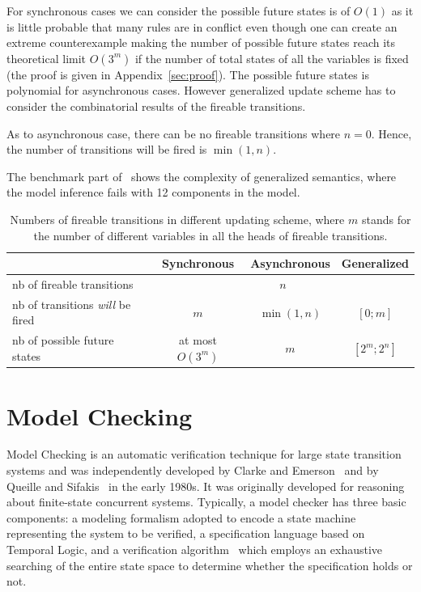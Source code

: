 For synchronous cases we can consider the possible future states is of $O(1)$ as it is little probable that many rules are in conflict even though one can create an extreme counterexample making the number of possible future states reach its theoretical limit $O(3^m)$ if the number of total states of all the variables is fixed (the proof is given in Appendix~\ref{sec:proof}).
The possible future states is polynomial for asynchronous cases.
However generalized update scheme has to consider the combinatorial results of the fireable transitions.

As to asynchronous case, there can be no fireable transitions where $n=0$.
Hence, the number of transitions will be fired is $\min(1,n)$.

The benchmark part of~\cite{ribeiro2018learning} shows the complexity of generalized semantics, where the model inference fails with 12 components in the model. 

\begin{table}[ht]
    \centering
    \small
    \begin{tabular}{l|c|c|c}
        &Synchronous&Asynchronous&Generalized\\
        \hline
        nb of fireable transitions&\multicolumn{3}{c}{$n$}\\
        \hline
        nb of transitions \textit{will} be fired&$m$&$\min(1,n)$&$[0;m]$\\
        \hline
        nb of possible future states& at most $O(3^m)$&$m$&$[2^m;2^n]$
    \end{tabular}
    \caption[Update schemes]{Numbers of fireable transitions %
    in different updating scheme, where $m$ stands for the number of different variables in all the heads of fireable transitions.}
    \label{tab:semantics}
\end{table}

\section{Model Checking}\label{sec:modelchecking}
Model Checking is an automatic verification technique for large state transition systems and was independently developed by Clarke and Emerson~\cite{clarke1981design} and by Queille and Sifakis~\cite{queille1982specification} in the early 1980s. It was originally developed for reasoning about finite-state concurrent systems.
Typically, a model checker has three basic components: a modeling formalism adopted to encode a state machine representing the system to be verified, a specification language based on Temporal Logic, and a verification algorithm~\cite{clarke20142} which employs an exhaustive searching of the entire state space to determine whether the specification holds or not.

